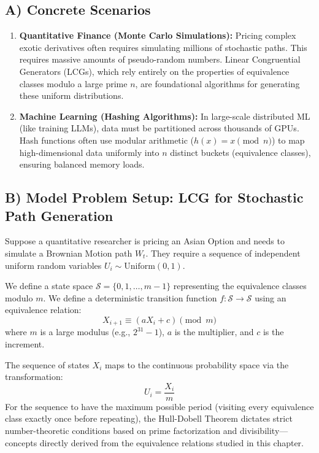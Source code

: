 \documentclass[11pt, a4paper]{article}
\theoremstyle{definition}
\theoremstyle{remark}
\begin{document}
\subsection{A) Concrete Scenarios}
\begin{enumerate}
    \item \textbf{Quantitative Finance (Monte Carlo Simulations):} Pricing complex exotic derivatives often requires simulating millions of stochastic paths. This requires massive amounts of pseudo-random numbers. Linear Congruential Generators (LCGs), which rely entirely on the properties of equivalence classes modulo a large prime $n$, are foundational algorithms for generating these uniform distributions.
    \item \textbf{Machine Learning (Hashing Algorithms):} In large-scale distributed ML (like training LLMs), data must be partitioned across thousands of GPUs. Hash functions often use modular arithmetic ($h(x) = x \pmod{n}$) to map high-dimensional data uniformly into $n$ distinct buckets (equivalence classes), ensuring balanced memory loads.
\end{enumerate}

\subsection{B) Model Problem Setup: LCG for Stochastic Path Generation}
Suppose a quantitative researcher is pricing an Asian Option and needs to simulate a Brownian Motion path $W_t$. They require a sequence of independent uniform random variables $U_i \sim \text{Uniform}(0,1)$. 

We define a state space $\mathcal{S} = \{0, 1, \dots, m-1\}$ representing the equivalence classes modulo $m$. We define a deterministic transition function $f: \mathcal{S} \to \mathcal{S}$ using an equivalence relation:
\[ \displaystyle X_{i+1} \equiv (aX_i + c) \pmod{m} \]
where $m$ is a large modulus (e.g., $2^{31}-1$), $a$ is the multiplier, and $c$ is the increment. 

The sequence of states $X_i$ maps to the continuous probability space via the transformation:
\[ \displaystyle U_i = \frac{X_i}{m} \]
For the sequence to have the maximum possible period (visiting every equivalence class exactly once before repeating), the Hull-Dobell Theorem dictates strict number-theoretic conditions based on prime factorization and divisibility—concepts directly derived from the equivalence relations studied in this chapter.

\newpage
\end{document}
